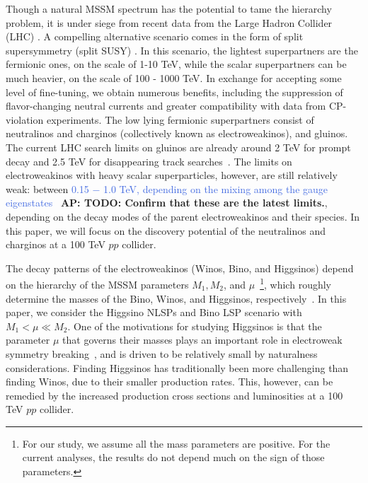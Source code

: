 \documentclass[a4paper,11pt]{article}
\newcommand{\Adarsh}[1]{{\bf\color{RoyalBlue} AP: #1}}
\newcommand{\ap}[1]{\textcolor{RoyalBlue}{#1}}
\begin{document}
Though a natural MSSM spectrum has the potential to tame the hierarchy problem,
it is under siege from recent data from the Large Hadron Collider (LHC)
\cite{Aaboud:2018ujj, Sirunyan:2018vjp}.  A compelling alternative scenario
comes in the form of split supersymmetry (split SUSY) \cite{Wells:2003tf,
ArkaniHamed:2004yi, Giudice:2004tc}. In this scenario, the lightest
superpartners are the fermionic ones, on the scale of 1-10 TeV, while the
scalar superpartners can be much heavier, on the scale of 100 - 1000 TeV. In
exchange for accepting some level of fine-tuning, we obtain numerous benefits,
including the suppression of flavor-changing neutral currents and greater
compatibility with data from CP-violation experiments.  The low lying fermionic
superpartners consist of neutralinos and charginos (collectively known as
electroweakinos), and gluinos. The current LHC search limits on gluinos are
already around 2 TeV for prompt decay and 2.5 TeV for disappearing track
searches~\cite{CMS-PAS-SUS-19-005}. The limits on electroweakinos with heavy
scalar superparticles, however, are still relatively weak: between \ap{0.15 $-$ 1.0
TeV, depending on the mixing among the gauge
eigenstates~\cite{ATL-PHYS-PUB-2019-022, Sirunyan:2017lae, Aaboud:2018htj,
Sirunyan:2018ubx, Aaboud:2018zeb}} \Adarsh{TODO: Confirm that these are the
latest limits.}, depending on the decay modes of the parent electroweakinos and
their species.  In this paper, we will focus on the discovery potential of the
neutralinos and charginos at a 100 TeV $pp$ collider. 

The decay patterns of the electroweakinos (Winos, Bino, and Higgsinos) depend
on the hierarchy of the MSSM parameters $M_1, M_2$, and $\mu$~\footnote{For our
study, we assume all the mass parameters are positive.  For the current
analyses, the results do not depend much on the sign of those parameters.},
which roughly determine the masses of the Bino, Winos, and Higgsinos,
respectively~\cite{Han:2013kza}.  In this paper, we consider the Higgsino NLSPs
and Bino LSP scenario with $M_1 < \mu \ll M_2$.  One of the motivations for
studying Higgsinos is that the parameter $\mu$ that governs their masses plays an
important role in electroweak symmetry breaking~\cite{Acharya:2014pua}, and
is driven to be relatively small by naturalness considerations. 
Finding Higgsinos has traditionally been more challenging than finding Winos,
due to their smaller production rates.
This, however, can be remedied by the increased production cross sections and 
luminosities at a 100 TeV $pp$ collider.
\end{document}
